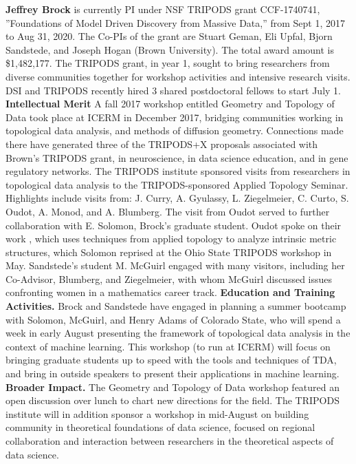 

\textbf{Jeffrey Brock} is currently PI under NSF TRIPODS grant CCF-1740741, ''Foundations of Model Driven Discovery from Massive Data,'' from Sept 1, 2017 to Aug 31, 2020. The Co-PIs of the grant are Stuart Geman, Eli Upfal, Bjorn Sandstede, and Joseph Hogan (Brown University). The total award amount is \$1,482,177. The TRIPODS grant, in year 1, sought to bring researchers from diverse communities together for workshop activities and intensive research visits. DSI and TRIPODS recently hired 3 shared postdoctoral fellows to start July 1. 
\textbf{Intellectual Merit} A fall 2017 workshop entitled Geometry and Topology of Data took place at ICERM in December 2017, bridging communities working in topological data analysis, and methods of diffusion geometry. Connections made there have generated three of the TRIPODS+X proposals associated with Brown's TRIPODS grant, in neuroscience, in data science education, and in gene regulatory networks.
The TRIPODS institute sponsored visits from researchers in topological data analysis to the TRIPODS-sponsored Applied Topology Seminar. Highlights include visits from: J. Curry, A. Gyulassy, L. Ziegelmeier, C. Curto, S. Oudot, A. Monod, and A. Blumberg.
The visit from Oudot served to further collaboration with E. Solomon, Brock's graduate student. Oudot spoke on their work \citep{Oudot:Solomon:persistence}, which uses techniques from applied topology to analyze intrinsic metric structures, which Solomon reprised at the Ohio State TRIPODS workshop in May. Sandstede's student M. McGuirl engaged with many visitors, including her Co-Advisor, Blumberg, and Ziegelmeier, with whom McGuirl discussed issues confronting women in a mathematics career track.
{\bf Education and Training Activities.} Brock and Sandstede have engaged in planning a summer bootcamp with Solomon, McGuirl, and Henry Adams of Colorado State, who will spend a week in early August presenting the framework of topological data analysis in the context of machine learning. This workshop (to run at ICERM) will focus on bringing graduate students up to speed with the tools and techniques of TDA, and bring in outside speakers to present their applications in machine learning.
{\bf Broader Impact.} The Geometry and Topology of Data workshop featured an open discussion over lunch to chart new directions for the field. The TRIPODS institute will in addition sponsor a workshop in mid-August on building community in theoretical foundations of data science, focused on regional collaboration and interaction between researchers in the theoretical aspects of data science.

